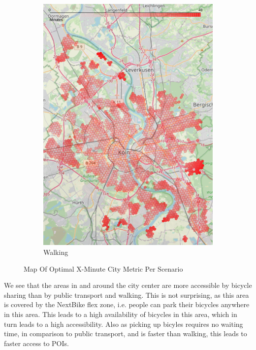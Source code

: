 \begin{figure}
\begin{subfigure}[b]{0.3\textwidth}
         \includegraphics[width=\textwidth]{Figures/results/minute_city_metric/walking_optimal_map}
         \caption{Walking}
         \label{fig:walking_optimal_map}
     \end{subfigure}
        \caption{Map Of Optimal X-Minute City Metric Per Scenario}
        \label{fig:optimal_map_per_scenario}
\end{figure}

We see that the areas in and around the city center are more accessible by bicycle sharing than by public transport and walking.
This is not surprising, as this area is covered by the NextBike flex zone, i.e. people can park their bicycles anywhere in this area.
This leads to a high availability of bicycles in this area, which in turn leads to a high accessibility.
Also as picking up bicyles requires no waiting time, in comparison to public transport, and is faster than walking, this leads to faster access to POIs.


